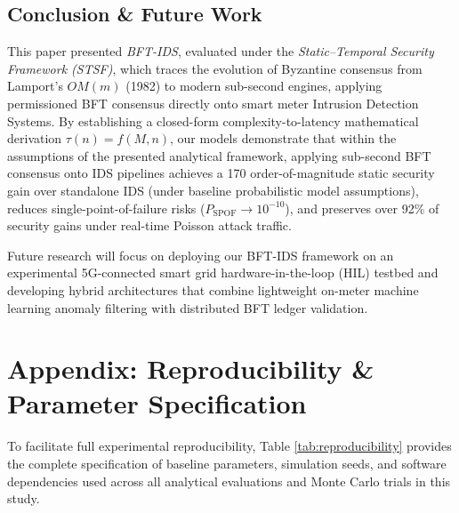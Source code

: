 \documentclass[10pt,twocolumn,journal]{IEEEtran}
\begin{document}
\subsection{Conclusion & Future Work}
This paper presented \emph{BFT-IDS}, evaluated under the \emph{Static–Temporal Security Framework (STSF)}, which traces the evolution of Byzantine consensus from Lamport's $OM(m)$ (1982) to modern sub-second engines, applying permissioned BFT consensus directly onto smart meter Intrusion Detection Systems. By establishing a closed-form complexity-to-latency mathematical derivation $\tau(n) = f(M, n)$, our models demonstrate that within the assumptions of the presented analytical framework, applying sub-second BFT consensus onto IDS pipelines achieves a 170 order-of-magnitude static security gain over standalone IDS (under baseline probabilistic model assumptions), reduces single-point-of-failure risks ($P_{\text{SPOF}} \to 10^{-10}$), and preserves over 92\% of security gains under real-time Poisson attack traffic.

Future research will focus on deploying our BFT-IDS framework on an experimental 5G-connected smart grid hardware-in-the-loop (HIL) testbed and developing hybrid architectures that combine lightweight on-meter machine learning anomaly filtering with distributed BFT ledger validation.

\section{Appendix: Reproducibility & Parameter Specification}
\label{sec:appendix}

To facilitate full experimental reproducibility, Table \ref{tab:reproducibility} provides the complete specification of baseline parameters, simulation seeds, and software dependencies used across all analytical evaluations and Monte Carlo trials in this study.
\end{document}
